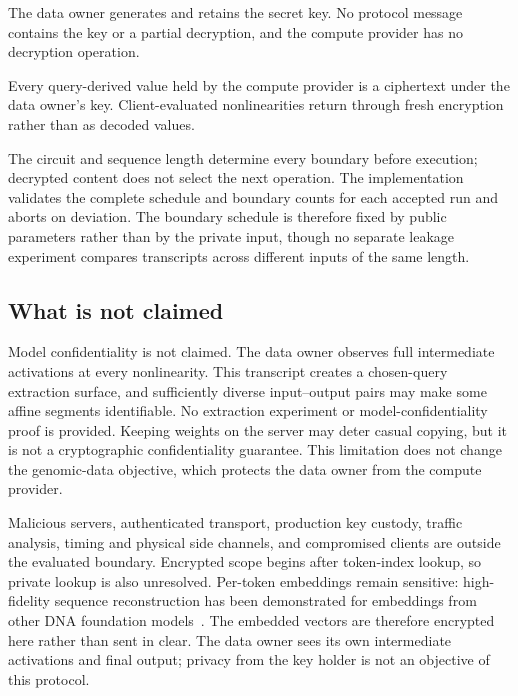 \begin{invariant}
The data owner generates and retains the secret key. No protocol message contains the key or a
partial decryption, and the compute provider has no decryption operation.
\end{invariant}

\begin{invariant}
Every query-derived value held by the compute provider is a ciphertext under the data owner's key.
Client-evaluated nonlinearities return through fresh encryption rather than as decoded values.
\end{invariant}

\begin{invariant}
The circuit and sequence length determine every boundary before execution; decrypted content does
not select the next operation. The implementation validates the complete schedule and boundary
counts for each accepted run and aborts on deviation. The boundary schedule is therefore fixed by
public parameters rather than by the private input, though no separate leakage experiment compares
transcripts across different inputs of the same length.
\end{invariant}

\subsection{What is not claimed}
Model confidentiality is not claimed. The data owner observes full intermediate activations at
every nonlinearity. This transcript creates a chosen-query extraction surface, and sufficiently
diverse input--output pairs may make some affine segments identifiable. No extraction experiment or
model-confidentiality proof is provided. Keeping weights on the server may deter casual copying,
but it is not a cryptographic confidentiality guarantee. This limitation does not change the
genomic-data objective, which protects the data owner from the compute provider.

Malicious servers, authenticated transport, production key custody, traffic analysis, timing and
physical side channels, and compromised clients are outside the evaluated boundary. Encrypted
scope begins after token-index lookup, so private lookup is also unresolved. Per-token embeddings
remain sensitive: high-fidelity sequence reconstruction has been demonstrated for embeddings from
other DNA foundation models~\cite{dnaembeddinginversion2026}. The embedded vectors are therefore
encrypted here rather than sent in clear. The data owner sees its own intermediate activations and
final output; privacy from the key holder is not an objective of this protocol.
